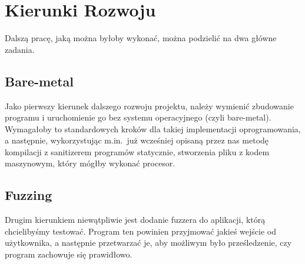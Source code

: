 \documentclass[../main.tex]{subfiles}
\begin{document}
		
	\section{Kierunki Rozwoju}
Dalszą pracę, jaką można byłoby wykonać, można podzielić na dwa główne zadania.

		\subsection{Bare-metal}
 Jako pierwszy kierunek dalszego rozwoju projektu, należy wymienić zbudowanie programu i uruchomienie go bez systemu operacyjnego (czyli bare-metal). Wymagałoby to standardowych kroków dla takiej implementacji oprogramowania, a następnie, wykorzystując m.in.\ już wcześniej opisaną przez nas metodę kompilacji z sanitizerem programów statycznie, stworzenia pliku z kodem maszynowym, który mógłby wykonać procesor.



		\subsection{Fuzzing}
		Drugim kierunkiem niewątpliwie jest dodanie fuzzera do aplikacji, którą chcielibyśmy testować. Program ten powinien przyjmować jakieś wejście od użytkownika, a następnie przetwarzać je, aby możliwym było prześledzenie, czy program zachowuje się prawidłowo.
\end{document}
